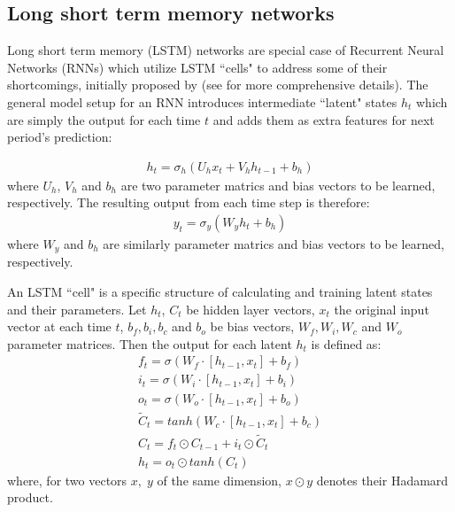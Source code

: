 \documentclass{article}
\begin{document}
\FloatBarrier
\subsection{Long short term memory networks}
Long short term memory (LSTM) networks are special case of Recurrent Neural Networks (RNNs) which utilize LSTM ``cells" to address some of their shortcomings, initially proposed by \cite{hochreiter_long_1997} (see for more comprehensive details). The general model setup for an RNN introduces intermediate ``latent" states $h_t$ which are simply the output for each time $t$ and adds them as extra features for next period's prediction:

\begin{align}
	h_t = \sigma_h (U_h x_t + V_h h_{t-1} + b_h)
\end{align}
where $U_h$, $V_h$ and $b_h$ are two parameter matrics and bias vectors to be learned, respectively. 
The resulting output from each time step is therefore:
\begin{align}
	y_t = \sigma_y (W_y h_t + b_h)
\end{align}
where $W_y$ and $b_h$ are similarly parameter matrics and bias vectors to be learned, respectively.

An LSTM ``cell" is a specific structure of calculating and training latent states and their parameters. Let $h_t$, $C_t$ be hidden layer vectors, $x_t$ the original input vector at each time $t$, $b_f, b_i, b_c$ and $b_o$ be bias vectors, $W_f, W_i, W_c$ and $W_o$ parameter matrices. Then the output for each latent $h_t$ is defined as:
\begin{align}
	f_t = \sigma(W_f \cdot [h_{t-1}, x_t] + b_f) \\
	i_t = \sigma(W_i \cdot [h_{t-1}, x_t] + b_i) \\
	o_t = \sigma(W_o \cdot [h_{t-1}, x_t] + b_o) \\
	\tilde{C}_t = tanh(W_c \cdot [h_{t-1}, x_t] + b_c) \\
	C_t = f_t \odot C_{t-1} + i_t \odot \tilde{C}_t \\
	h_t = o_t \odot tanh(C_t)
\end{align}
where, for two vectors $x,\;y$ of the same dimension, $x\odot y$ denotes their Hadamard product.
\end{document}

